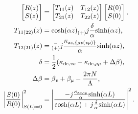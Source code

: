 \documentclass[lettersize,journal]{IEEEtran}
\begin{document}
    \begin{align}
        \begin{bmatrix}
            R(z) \\
            S(z)
        \end{bmatrix} &= 
        \begin{bmatrix}
            T_\text{11}(z) & T_\text{12}(z) \\
            T_\text{21}(z) & T_\text{22}(z)
        \end{bmatrix}
        \begin{bmatrix}
            R(0) \\
            S(0)
        \end{bmatrix}\text{,}\label{eq:four}\\
        T_\text{11(22)}(z) &= \text{cosh}(\alpha z){\substack{-\\(+)}} j\frac{\delta}{\alpha}\text{sinh}(\alpha z)\text{,}\label{eq:five}\\
        T_\text{12(21)}(z) &= {\substack{-\\(+)}} j\frac{\kappa_\text{ac,\{\textit{\textmu v}(\textit{v\textmu})\}}}
        {\alpha}\text{sinh}(\alpha z)\text{,}\label{eq:six}\\
        \delta &= \frac{1}{2}(\kappa_\text{dc,\textit{vv}} + \kappa_\text{dc,\textit{\textmu \textmu}} + \Delta \beta)\text{,}\label{eq:seven}\\
        \Delta \beta &= \beta_\text{\textit{v}} + \beta_\text{\textit{\textmu}} - \frac{2\pi N}{\Lambda}\text{,}\label{eq:eight}\\
        \left|\frac{S(0)}{R(0)}\right|_{S(L)=0}^2 &= \left|\frac{-j\frac{\kappa_\text{ac,\textit{v\textmu}}}{\alpha}\text{sinh}(\alpha L)}
                {\text{cosh}(\alpha L)+j\frac{\delta}{\alpha}\text{sinh}(\alpha L)}\right|^2\text{.}\label{eq:nine}
    \end{align}
\end{document}
